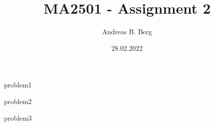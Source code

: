\documentclass{article}
\begin{document}
\mainmatter

\title{MA2501 - Assignment 2}
\author{Andreas B. Berg}
\date{28.02.2022}
\maketitle
\thispagestyle{fancy}

{problem1}

\pagebreak
{problem2}

\pagebreak
{problem3}




\end{document}
